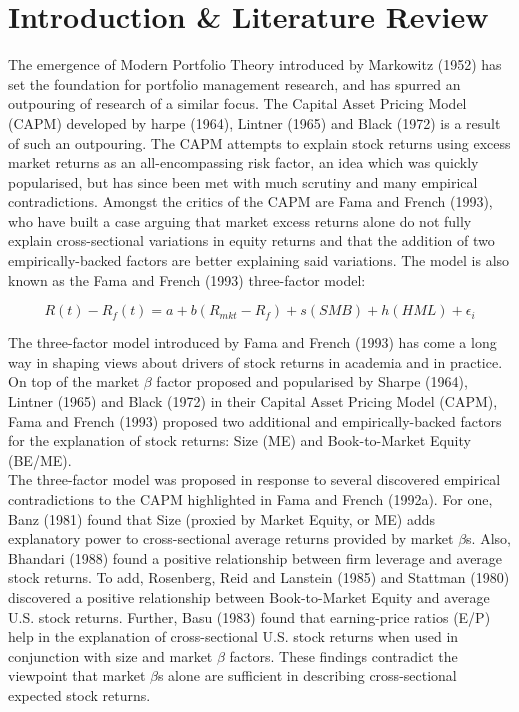 \documentclass[12pt]{article}
\begin{document}
	\section{Introduction \& Literature Review} %
	
	The emergence of Modern Portfolio Theory introduced by Markowitz (1952) has set the foundation for portfolio management research, and has spurred an outpouring of research of a similar focus. The Capital Asset Pricing Model (CAPM) developed by harpe (1964), Lintner (1965) and Black (1972) is a result of such an outpouring. The CAPM attempts to explain stock returns using excess market returns as an all-encompassing risk factor, an idea which was quickly popularised, but has since been met with much scrutiny and many empirical contradictions. Amongst the critics of the CAPM are Fama and French (1993), who have built a case arguing that market excess returns alone do not fully explain cross-sectional variations in equity returns and that the addition of two empirically-backed factors are better explaining said variations. The model is also known as the Fama and French (1993) three-factor model:
	
	$$
	R(t) - R_f(t) = a+ b(R_{mkt} - R_f) + s(SMB) + h(HML) +\epsilon_i
	$$
	
	\noindent The three-factor model introduced by Fama and French (1993) has come a long way in shaping views about drivers of stock returns in academia and in practice. On top of the market $\beta$ factor proposed and popularised by Sharpe (1964), Lintner (1965) and Black (1972) in their Capital Asset Pricing Model (CAPM), Fama and French (1993) proposed two additional and empirically-backed factors for the explanation of stock returns: Size (ME) and Book-to-Market Equity (BE/ME). \\
	
	\noindent The three-factor model was proposed in response to several discovered empirical contradictions to the CAPM highlighted in Fama and French (1992a). For one, Banz (1981) found that Size (proxied by Market Equity, or ME) adds explanatory power to cross-sectional average returns provided by market $\beta$s. Also, Bhandari (1988) found a positive relationship between firm leverage and average stock returns. To add, Rosenberg, Reid and Lanstein (1985) and Stattman (1980) discovered a positive relationship between Book-to-Market Equity and average U.S. stock returns. Further, Basu (1983) found that earning-price ratios (E/P) help in the explanation of cross-sectional U.S. stock returns when used in conjunction with size and market $\beta$ factors. These findings contradict the viewpoint that market $\beta$s alone are sufficient in describing cross-sectional expected stock returns. \\
	
\end{document}
